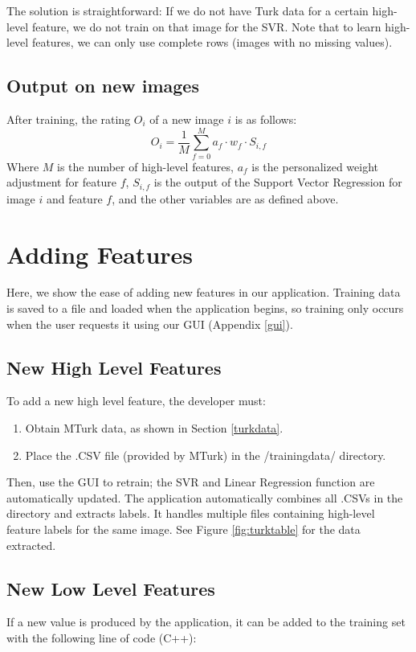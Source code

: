\documentclass[11pt,letter]{article}
\begin{document}
The solution is straightforward: If we do not have Turk data for a certain high-level feature, we do not train on that image for the SVR. Note that to learn high-level features, we can only use complete rows (images with no missing values).

\subsection{Output on new images}
After training, the rating $O_i$ of a new image $i$ is as follows:
\[
O_i=\frac{1}{M}\displaystyle\sum\limits_{f=0}^Ma_f \cdot w_f \cdot S_{i,f}
\]
Where $M$ is the number of high-level features, $a_f$ is the personalized weight adjustment for feature $f$, $S_{i,f}$ is the output of the Support Vector Regression for image $i$ and feature $f$, and the other variables are as defined above.

\section{Adding Features}
Here, we show the ease of adding new features in our application. Training data is saved to a file and loaded when the application begins, so training only occurs when the user requests it using our GUI (Appendix \ref{gui}).

\subsection{New High Level Features}
To add a new high level feature, the developer must:

\begin{enumerate}
\item Obtain MTurk data, as shown in Section \ref{turkdata}.
\item Place the .CSV file (provided by MTurk) in the /trainingdata/ directory.
\end{enumerate}

Then, use the GUI to retrain; the SVR and Linear Regression function are automatically updated. The application automatically combines all .CSVs in the directory and extracts labels. It handles multiple files containing high-level feature labels for the same image. See Figure \ref{fig:turktable} for the data extracted.

\subsection{New Low Level Features}
If a new value is produced by the application, it can be added to the training set with the following line of code (C++):
\end{document}

